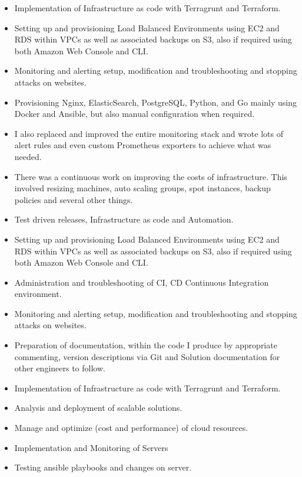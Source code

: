 \divider

\begin{itemize}
  \item Implementation of Infrastructure as code with Terragrunt and Terraform.
  \item Setting up and provisioning Load Balanced Environments using EC2 and RDS within VPCs as well as associated backups on S3, also if required using both Amazon Web Console and CLI.
  \item Monitoring and alerting setup, modification and troubleshooting and stopping attacks on websites.
  \item Provisioning Nginx, ElasticSearch, PostgreSQL, Python, and Go mainly using Docker and Ansible, but also manual configuration when required.
\end{itemize}

\divider

\begin{itemize}
  \item I also replaced and improved the entire monitoring stack and wrote lots of alert rules and even custom Prometheus exporters to achieve what was needed.
  \item There was a continuous work on improving the costs of infrastructure. This involved resizing machines, auto scaling groups, spot instances, backup policies and several other things.
  \item Test driven releases, Infrastructure as code and Automation.
  \item Setting up and provisioning Load Balanced Environments using EC2 and RDS within VPCs as well as associated backups on S3, also if required using both Amazon Web Console and CLI.
  \item Administration and troubleshooting of CI, CD Continuous Integration environment.
  \item Monitoring and alerting setup, modification and troubleshooting and stopping attacks on websites.
  \item Preparation of documentation, within the code I produce by appropriate commenting, version descriptions via Git and Solution documentation for other engineers to follow.
\end{itemize}

\divider

\begin{itemize}
  \item Implementation of Infrastructure as code with Terragrunt and Terraform.
  \item Analysis and deployment of scalable solutions.
  \item Manage and optimize (cost and performance) of cloud resources.
  \item Implementation and Monitoring of Servers
  \item Testing ansible playbooks and changes on server.
\end{itemize}

